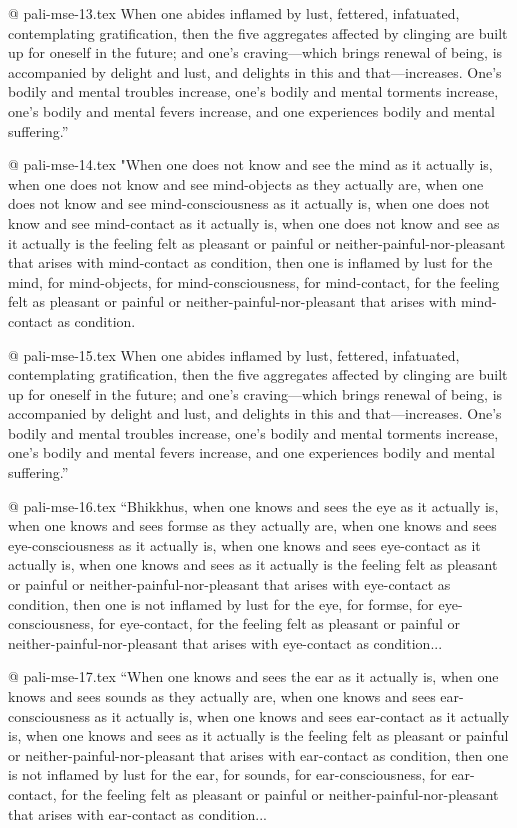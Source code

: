 @ pali-mse-13.tex
When one abides inflamed by lust, fettered, infatuated, contemplating gratification, then the five aggregates affected by clinging are built up for oneself in the future; and one’s craving—which brings renewal of being, is accompanied by delight and lust, and delights in this and that—increases. One’s bodily and mental troubles increase, one’s bodily and mental torments increase, one’s bodily and mental fevers increase, and one experiences bodily and mental suffering.”

@ pali-mse-14.tex
"When one does not know and see the mind as it actually is, when one does not know and see mind-objects as they actually are, when one does not know and see mind-consciousness as it actually is, when one does not know and see mind-contact as it actually is, when one does not know and see as it actually is the feeling felt as pleasant or painful or neither-painful-nor-pleasant that arises with mind-contact as condition, then one is inflamed by lust for the mind, for mind-objects, for mind-consciousness, for mind-contact, for the feeling felt as pleasant or painful or neither-painful-nor-pleasant that arises with mind-contact as condition.

@ pali-mse-15.tex
When one abides inflamed by lust, fettered, infatuated, contemplating gratification, then the five aggregates affected by clinging are built up for oneself in the future; and one’s craving—which brings renewal of being, is accompanied by delight and lust, and delights in this and that—increases. One’s bodily and mental troubles increase, one’s bodily and mental torments increase, one’s bodily and mental fevers increase, and one experiences bodily and mental suffering.”

@ pali-mse-16.tex
“Bhikkhus, when one knows and sees the eye as it actually is, when one knows and sees formse as they actually are, when one knows and sees eye-consciousness as it actually is, when one knows and sees eye-contact as it actually is, when one knows and sees as it actually is the feeling felt as pleasant or painful or neither-painful-nor-pleasant that arises with eye-contact as condition, then one is not inflamed by lust for the eye, for formse, for eye-consciousness, for eye-contact, for the feeling felt as pleasant or painful or neither-painful-nor-pleasant that arises with eye-contact as condition...

@ pali-mse-17.tex
	“When one knows and sees the ear as it actually is, when one knows and sees sounds as they actually are, when one knows and sees ear-consciousness as it actually is, when one knows and sees ear-contact as it actually is, when one knows and sees as it actually is the feeling felt as pleasant or painful or neither-painful-nor-pleasant that arises with ear-contact as condition, then one is not inflamed by lust for the ear, for sounds, for ear-consciousness, for ear-contact, for the feeling felt as pleasant or painful or neither-painful-nor-pleasant that arises with ear-contact as condition...

